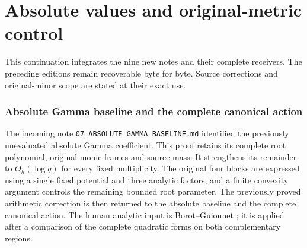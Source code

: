 \begingroup
\clearpage
\part{Absolute values and original-metric control}
\noindent This continuation integrates the nine new notes and their complete
receivers. The preceding editions remain recoverable byte for byte. Source
corrections and original-minor scope are stated at their exact use.
\providecommand{\tightlist}{\setlength{\itemsep}{0pt}\setlength{\parskip}{0pt}}
\providecommand{\C}{\mathbb C}\providecommand{\R}{\mathbb R}
\providecommand{\Z}{\mathbb Z}\providecommand{\Q}{\mathbb Q}
\providecommand{\N}{\mathbb N}
\providecommand{\im}{\operatorname{im}}
\providecommand{\diag}{\operatorname{diag}}
\providecommand{\Gr}{\operatorname{Gram}}
\providecommand{\Gram}{\operatorname{Gram}}
\providecommand{\Res}{\operatorname{Res}}
\providecommand{\cond}{\operatorname{cond}}
\providecommand{\ExtensionTok}[1]{#1}\providecommand{\NormalTok}[1]{#1}
\providecommand{\StringTok}[1]{#1}\providecommand{\BuiltInTok}[1]{#1}
\providecommand{\ControlFlowTok}[1]{#1}

\clearpage
\begingroup
\def\R{\mathbb R}
\def\C{\mathbb C}
\def\PP{\mathcal P}
\def\BB{\mathcal B}
\def\dd{\,d}
\def\Gram{\operatorname{Gram}}

\setcounter{equation}{0}
\renewcommand{\theequation}{A03AG.\arabic{equation}}
\section*{Absolute Gamma baseline and the complete canonical action}


\noindent The incoming note \texttt{07\_ABSOLUTE\_GAMMA\_BASELINE.md}
identified the previously unevaluated absolute Gamma coefficient. This proof
retains its complete root polynomial, original monic frames and source mass.
It strengthens its remainder to $O_h(\log q)$ for every fixed multiplicity.
The original four blocks are expressed using a single fixed potential and
three analytic factors, and a finite convexity argument controls the remaining
bounded root parameter. The previously proved arithmetic correction is then
returned to the absolute baseline and the complete canonical action.
The human analytic input is Borot--Guionnet \cite{a03ag:BG}; it is applied after
a comparison of the complete quadratic forms on both complementary regions.

